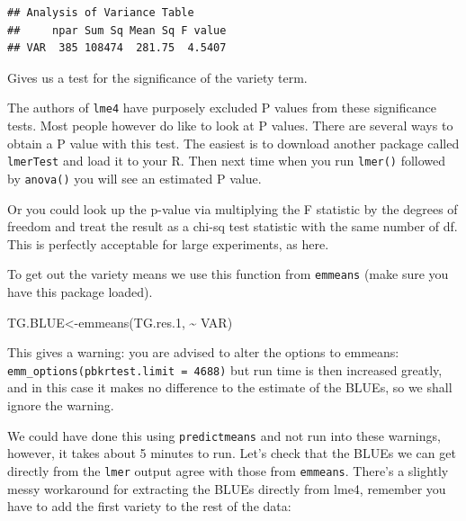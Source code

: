 \documentclass[
]{book}
\makeatletter
\newenvironment{Shaded}{\begin{snugshade}}{\end{snugshade}}
\newcommand{\FloatTok}[1]{\textcolor[rgb]{0.00,0.00,0.81}{#1}}
\newcommand{\FunctionTok}[1]{\textcolor[rgb]{0.00,0.00,0.00}{#1}}
\newcommand{\NormalTok}[1]{#1}
\newcommand{\OtherTok}[1]{\textcolor[rgb]{0.56,0.35,0.01}{#1}}
\newcommand{\SpecialCharTok}[1]{\textcolor[rgb]{0.00,0.00,0.00}{#1}}
\newenvironment{kframe}{%
\medskip{}
\setlength{\fboxsep}{.8em}
 \def\at@end@of@kframe{}%
 \ifinner\ifhmode%
  \def\at@end@of@kframe{\end{minipage}}%
  \begin{minipage}{\columnwidth}%
 \fi\fi%
 \def\FrameCommand##1{\hskip\@totalleftmargin \hskip-\fboxsep
 \colorbox{shadecolor}{##1}\hskip-\fboxsep
     \hskip-\linewidth \hskip-\@totalleftmargin \hskip\columnwidth}%
 \MakeFramed {\advance\hsize-\width
   \@totalleftmargin\z@ \linewidth\hsize
   \@setminipage}}%
 {\par\unskip\endMakeFramed%
 \at@end@of@kframe}
\newenvironment{rmdblock}[1]
  {
  \begin{itemize}
  \renewcommand{\labelitemi}{
    \raisebox{-.7\height}[0pt][0pt]{
      {\setkeys{Gin}{width=3em,keepaspectratio}\texttt{[image: images/\#1]}}
    }
  }
  \setlength{\fboxsep}{1em}
  \begin{kframe}
  \item
  }
  {
  \end{kframe}
  \end{itemize}
  }
\newenvironment{rmdnote}
  {\begin{rmdblock}{note}}
  {\end{rmdblock}}
\makeatother
\begin{document}
\begin{verbatim}
## Analysis of Variance Table
##     npar Sum Sq Mean Sq F value
## VAR  385 108474  281.75  4.5407
\end{verbatim}

Gives us a test for the significance of the variety term.

\begin{rmdnote}
The authors of \texttt{lme4} have purposely excluded P values from these significance tests. Most people however do like to look at P values. There are several ways to obtain a P value with this test. The easiest is to download another package called \texttt{lmerTest} and load it to your R. Then next time when you run \texttt{lmer()} followed by \texttt{anova()} you will see an estimated P value.

Or you could look up the p-value via multiplying the F statistic by the degrees of freedom and treat the result as a chi-sq test statistic with the same number of df. This is perfectly acceptable for large experiments, as here.
\end{rmdnote}

To get out the variety means we use this function from \texttt{emmeans} (make sure you have this package loaded).

\begin{Shaded}
\begin{Highlighting}[]
\NormalTok{TG.BLUE}\OtherTok{\textless{}{-}}\FunctionTok{emmeans}\NormalTok{(TG.res}\FloatTok{.1}\NormalTok{, }\SpecialCharTok{\textasciitilde{}}\NormalTok{ VAR)}
\end{Highlighting}
\end{Shaded}

This gives a warning: you are advised to alter the options to emmeans: \texttt{emm\_options(pbkrtest.limit\ =\ 4688)} but run time is then increased greatly, and in this case it makes no difference to the estimate of the BLUEs, so we shall ignore the warning.

We could have done this using \texttt{predictmeans} and not run into these warnings, however, it takes about 5 minutes to run. Let's check that the BLUEs we can get directly from the \texttt{lmer} output agree with those from \texttt{emmeans}. There's a slightly messy workaround for extracting the BLUEs directly from lme4, remember you have to add the first variety to the rest of the data:
\end{document}
